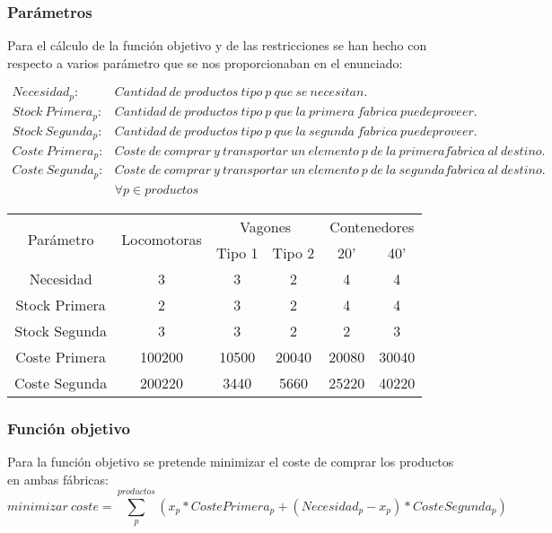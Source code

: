 \documentclass[11pt,spanish]{article}
\begin{document}
			\subsubsection{Parámetros}
			Para el cálculo de la función objetivo y de las restricciones se han hecho con respecto a varios parámetro que se nos proporcionaban en el enunciado:
			
			\begin{align*}
			Necesidad_p:& Cantidad\ de\ productos\ tipo\ p\ que\ se\ necesitan. \\
			Stock\ Primera_p:& Cantidad\ de\ productos\ tipo\ p\ que\ la\ primera\ f\acute{a}brica\ puede proveer. \\
			Stock\ Segunda_p:& Cantidad\ de\ productos\ tipo\ p\ que\ la\ segunda\ f\acute{a}brica\ puede proveer. \\
			Coste\ Primera_p:& Coste\ de\ comprar\ y\ transportar\ un\ elemento\ p\ de\ la\ primera f\acute{a}brica\ al\ destino. \\
			Coste\ Segunda_p:& Coste\ de\ comprar\ y\ transportar\ un\ elemento\ p\ de\ la\ segunda f\acute{a}brica\ al\ destino. \\
			&\forall p \in productos 
			\end{align*}
			\label{tab:params1}
			\begin{tabular}{ |c||c|c|c|c|c|  }	
			 	\hline
			 	\multirow{2}{*}{Parámetro} & \multirow{2}{*}{Locomotoras} &  \multicolumn{2}{|c|}{Vagones} & \multicolumn{2}{|c|}{Contenedores} \\
			 	& & Tipo 1 & Tipo 2 & 20' & 40'\\
			 	\hline
			 	Necesidad & 3 & 3 & 2 & 4 & 4 \\
			 	Stock Primera & 2 & 3 & 2 & 4 & 4 \\
			 	Stock Segunda & 3 & 3 & 2 & 2 & 3 \\
 			 	Coste Primera & 100200 & 10500 & 20040 & 20080 & 30040 \\
			 	Coste Segunda & 200220 & 3440 & 5660 & 25220 & 40220 \\
				\hline
			\end{tabular}

			\subsubsection{Función objetivo}
			Para la función objetivo se pretende minimizar el coste de comprar los productos en ambas fábricas:
			$$
			minimizar\ coste = \sum_p^{productos} (x_p * Coste Primera_p + (Necesidad_p - x_p) * Coste Segunda_p)
			$$
\end{document}
